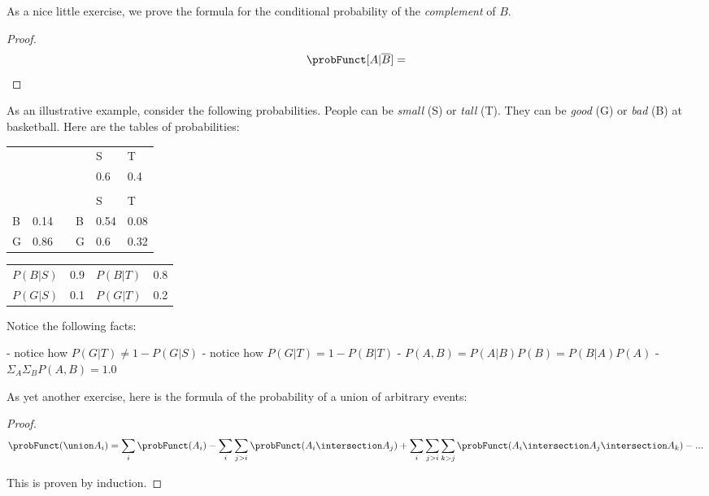 As a nice little exercise, we prove the formula for the conditional probability of the \emph{complement} of $B$.

\begin{proof}
    $$ \probFunct[A | \overline{B}] = $$
\end{proof}



As an illustrative example, consider the following probabilities. People can be \emph{small} (S) or \emph{tall} (T). They can be \emph{good} (G) or \emph{bad} (B) at basketball.
Here are the tables of probabilities:

\begin{table}[H]
    \centering
    \begin{tabular}{llllll}
      &      &  &   & S    & T    \\
      &      &  &   & 0.6  & 0.4  \\
      &      &  &   &      &      \\
      &      &  &   & S    & T    \\
    B & 0.14 &  & B & 0.54 & 0.08 \\
    G & 0.86 &  & G & 0.6  & 0.32
    \end{tabular}
\end{table}

\begin{table}[H]
    \centering
    \begin{tabular}{llll}
        $P(B|S)$ & 0.9 & $P(B|T)$ & 0.8 \\
        $P(G|S)$ & 0.1 & $P(G|T)$ & 0.2 
    \end{tabular}
\end{table}

Notice the following facts:

    - notice how $P(G|T) \neq 1 - P(G|S)$
    - notice how $P(G|T) = 1 - P(B|T)$
    - $P(A, B) = P(A|B) P(B) = P(B|A) P(A)$
    - $ \Sigma_A \Sigma_B P(A, B) = 1.0 $


As yet another exercise, here is the formula of the probability of a union of arbitrary events: 

\begin{proof}
    $$ \probFunct (\union A_i) = \sum_i \probFunct(A_i) 
            - \sum_i \sum_{j>i} \probFunct(A_i \intersection A_j) 
            + \sum_i \sum_{j>i} \sum_{k>j} \probFunct(A_i \intersection A_j \intersection A_k) 
            - ...  $$
    
    This is proven by induction. 
                
    
    
\end{proof}

